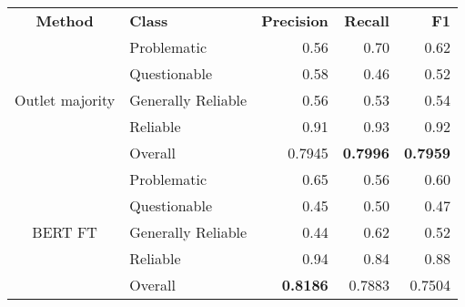 \begin{table}[htbp]
    \centering
    \scriptsize
    \begin{tabular}{| c | l | r | r | r |}
        \hline                            \textbf{Method} & \textbf{Class}     & \textbf{Precision} & \textbf{Recall} & \textbf{F1}     \\\cline{1-5}
        \multirow{5}{*}{Outlet majority}                  & Problematic        & 0.56               & 0.70            & 0.62            \\
                                                          & Questionable       & 0.58               & 0.46            & 0.52            \\
                                                          & Generally Reliable & 0.56               & 0.53            & 0.54            \\
                                                          & Reliable           & 0.91               & 0.93            & 0.92            \\\cline{2-5}
                                                          & Overall            & 0.7945             & \textbf{0.7996} & \textbf{0.7959} \\
        \hline
        \multirow{5}{*}{BERT FT}                          & Problematic        & 0.65               & 0.56            & 0.60            \\
                                                          & Questionable       & 0.45               & 0.50            & 0.47            \\
                                                          & Generally Reliable & 0.44               & 0.62            & 0.52            \\
                                                          & Reliable           & 0.94               & 0.84            & 0.88            \\\cline{2-5}
                                                          & Overall            & \textbf{0.8186}    & 0.7883          & 0.7504          \\
        \hline

\end{tabular}
\end{table}
